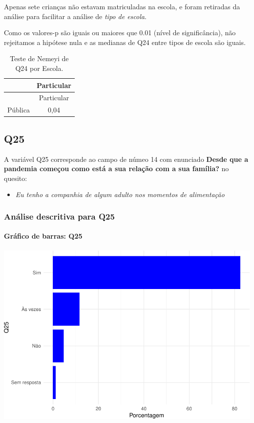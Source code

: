 \documentclass[]{article}
\providecommand{\tightlist}{%
  \setlength{\itemsep}{0pt}\setlength{\parskip}{0pt}}
\let\oldparagraph\paragraph
\renewcommand{\paragraph}[1]{\oldparagraph{#1}\mbox{}}
\begin{document}
Apenas sete crianças não estavam matriculadas na escola, e foram retiradas da análise para facilitar a análise de \emph{tipo de escola}.

Como os valores-p são iguais ou maiores que 0.01 (nível de significância), não rejeitamos a hipótese nula e as medianas de Q24 entre tipos de escola são iguais.

\begin{longtable}[]{@{}lc@{}}
\caption{\label{tab:unnamed-chunk-652}Teste de Nemeyi de Q24 por Escola.}\tabularnewline
\toprule
& Particular\tabularnewline
\midrule
\endfirsthead
\toprule
& Particular\tabularnewline
\midrule
\endhead
Pública & 0,04\tabularnewline
\bottomrule
\end{longtable}

\cleardoublepage

\hypertarget{q25}{%
\subsection{Q25}\label{q25}}

A variável Q25 corresponde ao campo de númeo 14 com enunciado \textbf{Desde que a pandemia começou como está a sua relação com a sua família?} no quesito:

\begin{itemize}
\tightlist
\item
  \emph{Eu tenho a companhia de algum adulto nos momentos de alimentação}
\end{itemize}

\hypertarget{anuxe1lise-descritiva-para-q25}{%
\subsubsection{Análise descritiva para Q25}\label{anuxe1lise-descritiva-para-q25}}

\hypertarget{gruxe1fico-de-barras-q25}{%
\paragraph{Gráfico de barras: Q25}\label{gruxe1fico-de-barras-q25}}

\begin{center}\includegraphics[width=0.75\linewidth]{relatorio_covid19_files/figure-latex/unnamed-chunk-659-1} \end{center}
\end{document}
